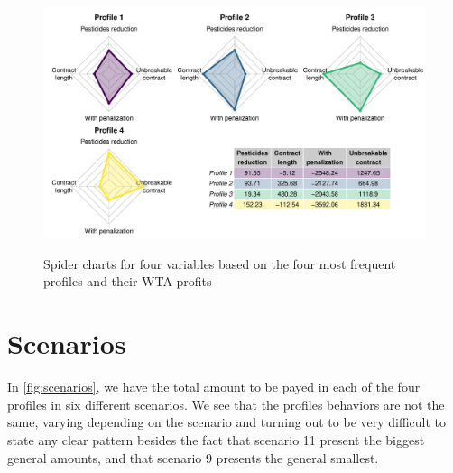 \documentclass[12pt]{article}
\begin{document}
\begin{figure}[H]
 \centering
 \includegraphics[width=\textwidth]{figures/spiders_wta.pdf}\\
 \caption{Spider charts for four variables based on the four most
          frequent profiles and their WTA profits}
 \label{fig:spiders_wta}
\end{figure}

\section*{Scenarios}

In \autoref{fig:scenarios}, we have the total amount to be payed in each
of the four profiles in six different scenarios. We see that the
profiles behaviors are not the same, varying depending on the scenario
and turning out to be very difficult to state any clear pattern besides
the fact that scenario 11 present the biggest general amounts, and that
scenario 9 presents the general smallest.
\end{document}
